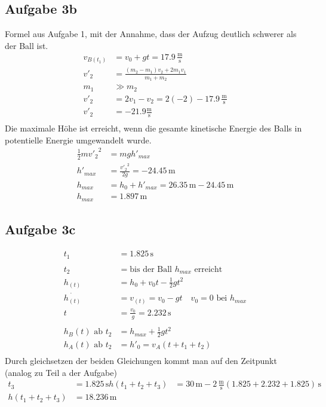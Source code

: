 \documentclass[a4paper,10pt]{extarticle}
\begin{document}
  \subsection*{Aufgabe 3b}
  Formel aus Aufgabe 1, mit der Annahme, dass der Aufzug deutlich schwerer als der Ball ist.
  \begin{align*}
  v_{B(t_1)} &= v_0 + gt = 17.9 \, \frac{\mbox{m}}{\mbox{s}} \\
  v'_2 &= \frac{(m_2 - m_1)v_2 + 2 m_1 v_1}{m_1 + m_2} \\
  m_1 &\gg m_2 \\
  v'_2 &= 2v_1 - v_2 = 2(-2) - 17.9 \, \frac{\mbox{m}}{\mbox{s}} \\
  v'_2 &= -21.9 \frac{\mbox{m}}{\mbox{s}} \\
  \end{align*}
  Die maximale Höhe ist erreicht, wenn die gesamte kinetische Energie des Balls in potentielle Energie umgewandelt wurde.
  \begin{align*}
  \frac{1}{2} m {v'_2}^2 &= m g h'_{max} \\
  h'_{max} &= \frac{{v'_2}^2}{2g} = -24.45 \, \mbox{m} \\
  h_{max} &= h_0 + h'_{max} = 26.35 \, \mbox{m} - 24.45 \, \mbox{m} \\
  h_{max} &= 1.897 \, \mbox{m}
  \end{align*}

  \subsection*{Aufgabe 3c}
  \begin{align*}
  t_1 &= 1.825 \, \mbox{s} \\ \\
  t_2 &= \mbox{bis der Ball $h_{max}$ erreicht} \\
  h_{(t)} &= h_0 + v_0t - \frac{1}{2}gt^2 \\
  \dot{h_{(t)}} &= v_{(t)} = v_0 - gt \quad v_0 = 0 \mbox{ bei } h_{max} \\
  t &= \frac{v_0}{g} = 2.232 \, \mbox{s} \\ \\
  h_B{(t)} \mbox{ ab } t_2 &= h_{max} + \frac{1}{2}gt^2 \\
  h_A{(t)} \mbox{ ab } t_2 &= h'_0 = v_A(t + t_1 + t_2) \\
  \end{align*}
  Durch gleichsetzen der beiden Gleichungen kommt man auf den Zeitpunkt (analog zu Teil a der Aufgabe)
  \begin{align*}
  t_3 &= 1.825 \, \mbox{s}
  h{(t_1 + t_2 + t_3)} &= 30 \, \mbox{m} - 2 \, \frac{\mbox{m}}{\mbox{s}} (1.825 + 2.232 + 1.825)\, \mbox{s} \\
  h{(t_1 + t_2 + t_3)} &= 18.236 \, \mbox{m}
  \end{align*}
\end{document}

